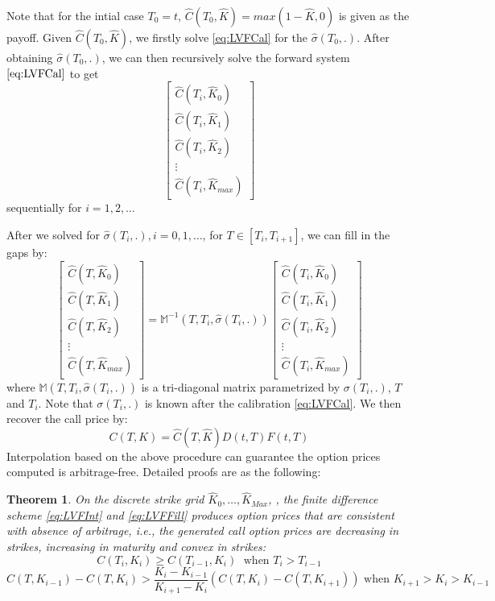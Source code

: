\documentclass[letterpaper,12pt,titlepage,oneside,final]{book}
\numberwithin{equation}{section}
\newtheorem{thm}{Theorem}[section]
\theoremstyle{definition}
\begin{document}
Note that for the intial case $T_0=t$, $\widehat{C}(T_0,\widehat{K})=max(1-\widehat{K},0)$ is given as the payoff. Given $\widehat{C}(T_0,\widehat{K})$, we firstly solve \eqref{eq:LVFCal} for the $\widehat{\sigma}(T_0,.).$ After obtaining $\widehat{\sigma}(T_0,.)$, we can then recursively solve the forward system  $\eqref{eq:LVFCal}$ to get \[
	\begin{bmatrix}
		\widehat{C}(T_i,\widehat{K}_0)\\
		\widehat{C}(T_i,\widehat{K}_1)\\
		\widehat{C}(T_i,\widehat{K}_2)\\
		\vdots\\
		\widehat{C}(T_i,\widehat{K}_{max})
		\end{bmatrix}
\] sequentially for $i=1,2,\dots$




After we solved for  $\widehat{\sigma}(T_i,.), i=0,1,\dots$, for $T \in [T_i,T_{i+1}]$, we can fill in the gaps by:
	\begin{equation}
	\begin{bmatrix}
	\widehat{C}(T,\widehat{K}_0)\\
	\widehat{C}(T,\widehat{K}_1)\\
	\widehat{C}(T,\widehat{K}_2)\\
	\vdots\\
	\widehat{C}(T,\widehat{K}_{max})
	\end{bmatrix}=\mathcal{\mathbb{M}}^{-1} (T,T_{i}, \widehat{\sigma}(T_i,.))\begin{bmatrix}
		\widehat{C}_{}(T_{i},\widehat{K}_0)\\
		\widehat{C}_{}(T_{i},\widehat{K}_1)\\
		\widehat{C}_{}(T_{i},\widehat{K}_2)\\
		\vdots\\
		\widehat{C}_{}(T_{i},\widehat{K}_{max})
		\end{bmatrix}
		\label{eq:LVFFill}
	\end{equation}
where $\mathcal{\mathbb{M}} (T,T_{i}, \widehat{\sigma}(T_i,.))$ is a tri-diagonal matrix parametrized by  $\sigma(T_i,.)$, $T$ and $T_i$. Note that $\sigma(T_i,.)$ is known after the calibration \eqref{eq:LVFCal}.
We then recover the call price by:
\[
C(T,K)=\widehat{C}(T,\widehat{K}){D(t,T)F(t,T)}
\]
Interpolation based on the above procedure can guarantee the option prices computed is arbitrage-free. Detailed proofs are as the following:
\begin{thm}
	On the discrete strike grid $\widehat{K}_0,\dots, \widehat{K}_{Max}$, 
	, the finite difference scheme \eqref{eq:LVFInt} and  \eqref{eq:LVFFill} produces option prices that are consistent with absence of arbitrage, i.e., the generated call option prices are decreasing in strikes, increasing in maturity and convex in strikes:
	\[
			C(T_i,K_{i})\geq C(T_{i-1},K_{i}) \; \text{ when } T_{i}>T_{i-1}
	\]
	\[
	C(T,K_{i-1})-C(T,K_{i}) > \frac{K_i-K_{i-1}}{K_{i+1}-K_{i}}\left( C(T,K_{i})-C(T,K_{i+1})  \right) \text{ when } K_{i+1}>K_{i}>K_{i-1}
	\]
 
\end{thm}
	
\end{document}
